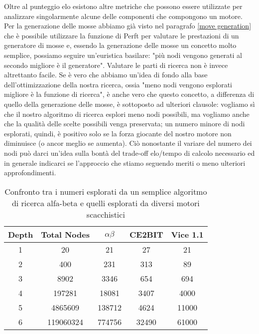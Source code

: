 Oltre al punteggio elo esistono altre metriche che possono essere utilizzate per analizzare singolarmente alcune delle componenti che compongono un motore.
Per la generazione delle mosse abbiamo già visto nel paragrafo \ref{move generation} che è possibile utilizzare la funzione di Perft per valutare le prestazioni di un generatore di mosse e, essendo la generazione
delle mosse un concetto molto semplice, possiamo seguire un'euristica basilare: "più nodi vengono generati al secondo migliore è il generatore". Valutare le parti 
di ricerca non è invece altrettanto facile. Se è vero che abbiamo un'idea di fondo alla base dell'ottimizzazione della nostra ricerca, ossia "meno nodi vengono esplorati migliore è la funzione di ricerca", è anche vero 
che questo concetto, a differenza di quello della generazione delle mosse, è sottoposto ad ulteriori clausole: vogliamo sì che il nostro algoritmo di ricerca esplori meno nodi possibili, ma vogliamo anche che la qualità
delle scelte possibili venga preservata; un numero minore di nodi esplorati, quindi, è positivo solo se la forza giocante del nostro motore non diminuisce (o ancor meglio se aumenta). Ciò nonostante il variare del numero dei nodi 
può darci un'idea sulla bontà del trade-off elo/tempo di calcolo necessario ed in generale indicarci se l'approccio che stiamo seguendo meriti o meno ulteriori approfondimenti.
\begin{table}[h]
\begin{center}
    \begin{tabular}{|c|c|c|c|c|} 
     \hline
     Depth & Total Nodes  & $\alpha\beta$ & CE2BIT & Vice 1.1 \\ [0.5ex] 
     \hline
     1 & 20  & 21 & 27 & 21 \\ 
     \hline
     2 & 400  &  231 & 313 & 89\\
     \hline
     3 & 8902  &  3346 & 654 & 694 \\
     \hline
     4 & 197281  & 18081 &  3407 & 4000 \\
     \hline
     5 & 4865609  & 138712 & 4624 & 11000 \\ 
     \hline
     6 & 119060324  & 774756 & 32490 & 61000\\
     \hline
    \end{tabular}
    \caption{Confronto tra i numeri esplorati da un semplice algoritmo di ricerca alfa-beta e quelli esplorati da diversi motori scacchistici} \label{tab:sometab}
    \end{center}
\end{table}


